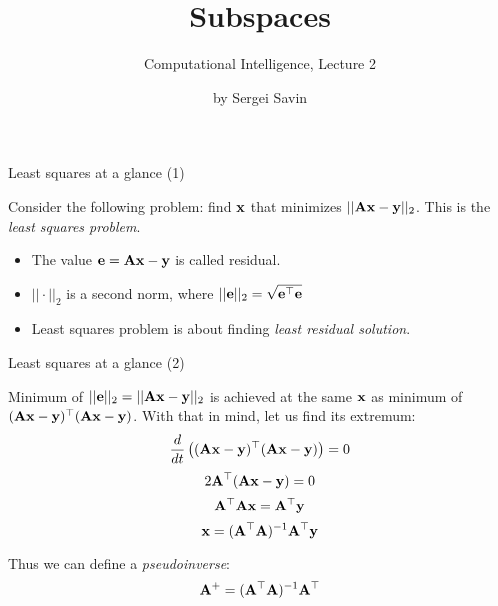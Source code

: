 \documentclass{beamer}
\title{Subspaces}
\subtitle{Computational Intelligence, Lecture 2}
\author{by Sergei Savin}
\date{\mydate}
\begin{document}
\maketitle



\begin{frame}{Least squares at a glance (1)}
	\begin{flushleft}
		
		Consider the following problem: find $\mathbf{x}$ that minimizes $|| \mathbf{A}\mathbf{x} - \mathbf{y} ||_2$. This is the \emph{least squares problem}. 
		
		\bigskip
		
		\begin{itemize}
			\item The value $\mathbf{e} = \mathbf{A}\mathbf{x} - \mathbf{y}$ is called residual.
			
			\item $|| \cdot ||_2$ is a second norm, where $|| \mathbf{e} ||_2 = \sqrt{\mathbf{e}^\top\mathbf{e}}$
			
			\item Least squares problem is about finding \emph{least residual solution}.
		\end{itemize}
		
		
		
	\end{flushleft}
\end{frame}




\begin{frame}{Least squares at a glance (2)}
	\begin{flushleft}
		
		Minimum of $||\mathbf{e}||_2 = ||\mathbf{A}\mathbf{x} - \mathbf{y}||_2$ is achieved at the same $\mathbf{x}$ as minimum of $(\mathbf{A}\mathbf{x} - \mathbf{y})^\top(\mathbf{A}\mathbf{x} - \mathbf{y})$. With that in mind, let us find its extremum:
		\begin{equation}
			\frac{d}{dt} \left( (\mathbf{A}\mathbf{x} - \mathbf{y})^\top(\mathbf{A}\mathbf{x} - \mathbf{y}) \right) 
			= 0
		\end{equation}
		\begin{equation}
			2\mathbf{A}^\top(\mathbf{A}\mathbf{x} - \mathbf{y}) = 0
		\end{equation}
		\begin{equation}
			\mathbf{A}^\top\mathbf{A}\mathbf{x} = \mathbf{A}^\top\mathbf{y}
		\end{equation}
		\begin{equation}
			\mathbf{x} = (\mathbf{A}^\top\mathbf{A})^{-1} \mathbf{A}^\top\mathbf{y}
		\end{equation}
		
		Thus we can define a \emph{pseudoinverse}:
		\begin{equation}
			\mathbf{A}^+ = (\mathbf{A}^\top\mathbf{A})^{-1} \mathbf{A}^\top
		\end{equation}
		
		
	\end{flushleft}
\end{frame}
\end{document}
